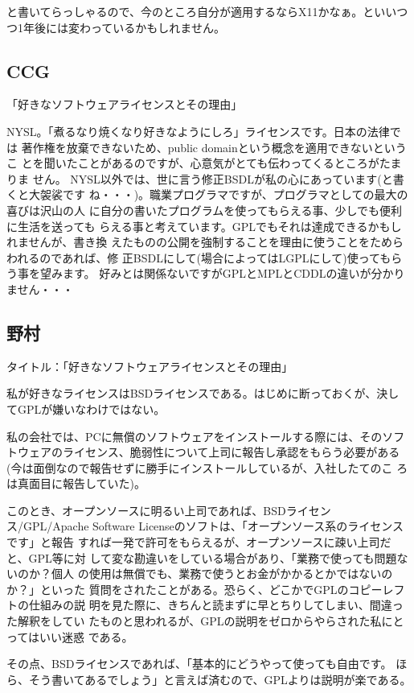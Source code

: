 \documentclass[mingoth,a4paper]{jsarticle}
\begin{document}
\begin{multicols}{2}
{と書いてらっしゃるので、今のところ自分が適用するならX11かなぁ。といいつつ1年後には変わっているかもしれません。

\subsection{CCG}


「好きなソフトウェアライセンスとその理由」

NYSL。「煮るなり焼くなり好きなようにしろ」ライセンスです。日本の法律では
著作権を放棄できないため、public domainという概念を適用できないというこ
とを聞いたことがあるのですが、心意気がとても伝わってくるところがたまりま
せん。
NYSL以外では、世に言う修正BSDLが私の心にあっています(と書くと大袈裟です
ね・・・)。職業プログラマですが、プログラマとしての最大の喜びは沢山の人
に自分の書いたプログラムを使ってもらえる事、少しでも便利に生活を送っても
らえる事と考えています。GPLでもそれは達成できるかもしれませんが、書き換
えたものの公開を強制することを理由に使うことをためらわれるのであれば、修
正BSDLにして(場合によってはLGPLにして)使ってもらう事を望みます。
好みとは関係ないですがGPLとMPLとCDDLの違いが分かりません・・・

\subsection{野村}

タイトル：「好きなソフトウェアライセンスとその理由」

私が好きなライセンスはBSDライセンスである。はじめに断っておくが、決し
てGPLが嫌いなわけではない。

私の会社では、PCに無償のソフトウェアをインストールする際には、そのソフ
トウェアのライセンス、脆弱性について上司に報告し承認をもらう必要がある
(今は面倒なので報告せずに勝手にインストールしているが、入社したてのこ
ろは真面目に報告していた)。

このとき、オープンソースに明るい上司であれば、BSDライセンス/GPL/Apache
Software Licenseのソフトは、「オープンソース系のライセンスです」と報告
すれば一発で許可をもらえるが、オープンソースに疎い上司だと、GPL等に対
して変な勘違いをしている場合があり、「業務で使っても問題ないのか？個人
の使用は無償でも、業務で使うとお金がかかるとかではないのか？」といった
質問をされたことがある。恐らく、どこかでGPLのコピーレフトの仕組みの説
明を見た際に、きちんと読まずに早とちりしてしまい、間違った解釈をしてい
たものと思われるが、GPLの説明をゼロからやらされた私にとってはいい迷惑
である。

その点、BSDライセンスであれば、「基本的にどうやって使っても自由です。
ほら、そう書いてあるでしょう」と言えば済むので、GPLよりは説明が楽である。

}
\end{multicols}
\end{document}
